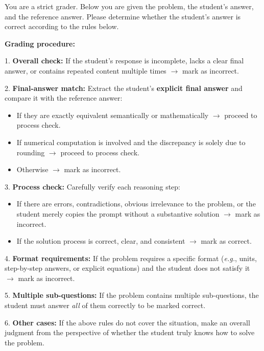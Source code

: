 \begin{MyBox}{}
\footnotesize
\linespread{0.8}\selectfont
You are a strict grader. Below you are given the problem, the student's answer, and the reference answer. Please determine whether the student's answer is correct according to the rules below.

\textbf{Grading procedure:}

1. \textbf{Overall check:} If the student's response is incomplete, lacks a clear final answer, or contains repeated content multiple times $\rightarrow$ mark as incorrect.

2. \textbf{Final-answer match:} Extract the student's \textbf{explicit final answer} and compare it with the reference answer:
   \begin{itemize}[itemsep=0pt, parsep=0pt, topsep=0pt]
      \item If they are exactly equivalent semantically or mathematically $\rightarrow$ proceed to process check.
      \item If numerical computation is involved and the discrepancy is solely due to rounding $\rightarrow$ proceed to process check.
      \item Otherwise $\rightarrow$ mark as incorrect.
   \end{itemize}

3. \textbf{Process check:} Carefully verify each reasoning step:
   \begin{itemize}[itemsep=0pt, parsep=0pt, topsep=0pt]
      \item If there are errors, contradictions, obvious irrelevance to the problem, or the student merely copies the prompt without a substantive solution $\rightarrow$ mark as incorrect.
      \item If the solution process is correct, clear, and consistent $\rightarrow$ mark as correct.
   \end{itemize}

4. \textbf{Format requirements:} If the problem requires a specific format (\textit{e.g.}, units, step-by-step answers, or explicit equations) and the student does not satisfy it $\rightarrow$ mark as incorrect.

5. \textbf{Multiple sub-questions:} If the problem contains multiple sub-questions, the student must answer \emph{all} of them correctly to be marked correct.

6. \textbf{Other cases:} If the above rules do not cover the situation, make an overall judgment from the perspective of whether the student truly knows how to solve the problem.


\end{MyBox}
